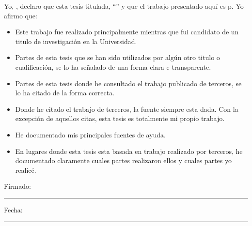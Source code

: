 \documentclass[
11pt, %
spanish, %
singlespacing, %
headsepline, %
]{MastersDoctoralThesis} %
\begin{document}

\begin{declaration}
\noindent Yo, \authorname, declaro que esta tesis titulada, \enquote{\ttitle} y que el trabajo presentado aquí es p. Yo afirmo que:

\begin{itemize}
\item Este trabajo fue realizado principalmente mientras que fui candidato de un titulo de investigación en la Universidad.
\item Partes de esta tesis que se han sido utilizados por algún otro titulo o cualificación, se lo ha señalado de una forma clara e transparente.
\item Partes de esta tesis donde he consultado el trabajo publicado de terceros, se lo ha citado de la forma correcta.
\item Donde he citado el trabajo de terceros, la fuente siempre esta dada. Con la excepción de aquellos citas, esta tesis es totalmente mi propio trabajo.
\item He documentado mis principales fuentes de ayuda.
\item En lugares donde esta tesis esta basada en trabajo realizado por terceros, he documentado claramente cuales partes realizaron ellos y cuales partes yo realicé.\\
\end{itemize}

\noindent Firmado:\\
\rule[0.5em]{25em}{0.5pt} %

\noindent Fecha:\\
\rule[0.5em]{25em}{0.5pt} %
\end{declaration}

\cleardoublepage


\vspace*{0.2\textheight}
\end{document}
